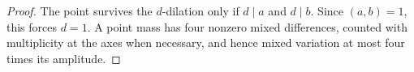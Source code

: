 \begin{proof}
The point survives the \(d\)-dilation only if \(d\mid a\) and \(d\mid b\).
Since \((a,b)=1\), this forces \(d=1\).  A point mass has four nonzero
mixed differences, counted with multiplicity at the axes when necessary,
and hence mixed variation at most four times its amplitude.
\end{proof}
